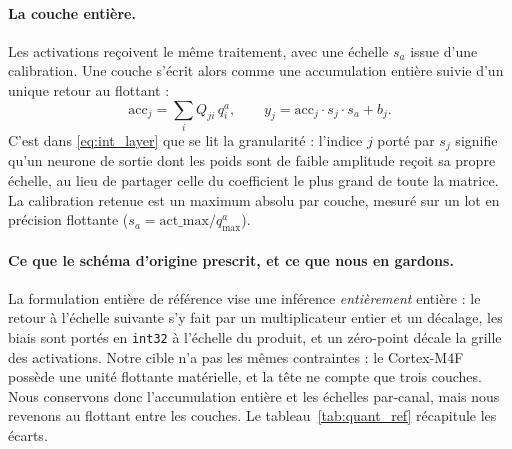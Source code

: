 \paragraph{La couche entière.} Les activations reçoivent le même traitement, avec une échelle $s_a$
issue d'une calibration. Une couche s'écrit alors comme une accumulation entière suivie d'un unique
retour au flottant :
\begin{equation}
\label{eq:int_layer}
\mathrm{acc}_j = \sum_i Q_{ji} \, q^a_i ,
\qquad
y_j = \mathrm{acc}_j \cdot s_j \cdot s_a + b_j .
\end{equation}
C'est dans \eqref{eq:int_layer} que se lit la granularité : l'indice $j$ porté par $s_j$ signifie qu'un
neurone de sortie dont les poids sont de faible amplitude reçoit sa propre échelle, au lieu de partager
celle du coefficient le plus grand de toute la matrice. La calibration retenue est un maximum absolu
par couche, mesuré sur un lot en précision flottante ($s_a = \mathrm{act\_max}/q^a_{\max}$).

\paragraph{Ce que le schéma d'origine prescrit, et ce que nous en gardons.} La formulation entière de
référence \cite{Jacob2018,Krishnamoorthi2018} vise une inférence \emph{entièrement} entière : le retour
à l'échelle suivante s'y fait par un multiplicateur entier et un décalage, les biais sont portés en
\texttt{int32} à l'échelle du produit, et un zéro-point décale la grille des activations. Notre cible
n'a pas les mêmes contraintes : le Cortex-M4F possède une unité flottante matérielle, et la tête ne
compte que trois couches. Nous conservons donc l'accumulation entière et les échelles par-canal, mais
nous revenons au flottant entre les couches. Le tableau~\ref{tab:quant_ref} récapitule les écarts.


